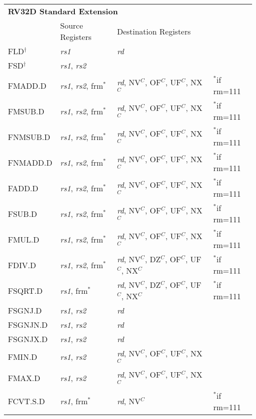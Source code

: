\begin{tabular}{p{25mm}|p{3cm}|p{6cm}|p{10cm}}
  \multicolumn{4}{l}{\bf RV32D Standard Extension} \\
  \cline{2-3}
   & Source Registers & Destination Registers \\
  \cline{2-3}
   FLD$^\dagger$ & {\em rs1} & {\em rd} &  \\
   \cline{2-3}
   FSD$^\dagger$ & {\em rs1}, {\em rs2} &  &  \\
   \cline{2-3}
   FMADD.D & {\em rs1}, {\em rs2}, frm$^*$ & {\em rd}, NV$^C$, OF$^C$, UF$^C$, NX$^C$ & $^*$if rm=111 \\
   \cline{2-3}
   FMSUB.D & {\em rs1}, {\em rs2}, frm$^*$ & {\em rd}, NV$^C$, OF$^C$, UF$^C$, NX$^C$ & $^*$if rm=111 \\
   \cline{2-3}
   FNMSUB.D & {\em rs1}, {\em rs2}, frm$^*$ & {\em rd}, NV$^C$, OF$^C$, UF$^C$, NX$^C$ & $^*$if rm=111 \\
   \cline{2-3}
   FNMADD.D & {\em rs1}, {\em rs2}, frm$^*$ & {\em rd}, NV$^C$, OF$^C$, UF$^C$, NX$^C$ & $^*$if rm=111 \\
   \cline{2-3}
   FADD.D & {\em rs1}, {\em rs2}, frm$^*$ & {\em rd}, NV$^C$, OF$^C$, UF$^C$, NX$^C$ & $^*$if rm=111 \\
   \cline{2-3}
   FSUB.D & {\em rs1}, {\em rs2}, frm$^*$ & {\em rd}, NV$^C$, OF$^C$, UF$^C$, NX$^C$ & $^*$if rm=111 \\
   \cline{2-3}
   FMUL.D & {\em rs1}, {\em rs2}, frm$^*$ & {\em rd}, NV$^C$, OF$^C$, UF$^C$, NX$^C$ & $^*$if rm=111 \\
   \cline{2-3}
   FDIV.D & {\em rs1}, {\em rs2}, frm$^*$ & {\em rd}, NV$^C$, DZ$^C$, OF$^C$, UF$^C$, NX$^C$ & $^*$if rm=111 \\
   \cline{2-3}
   FSQRT.D & {\em rs1}, frm$^*$ & {\em rd}, NV$^C$, DZ$^C$, OF$^C$, UF$^C$, NX$^C$ & $^*$if rm=111 \\
   \cline{2-3}
   FSGNJ.D & {\em rs1}, {\em rs2} & {\em rd} &  \\
   \cline{2-3}
   FSGNJN.D & {\em rs1}, {\em rs2} & {\em rd} &  \\
   \cline{2-3}
   FSGNJX.D & {\em rs1}, {\em rs2} & {\em rd} &  \\
   \cline{2-3}
   FMIN.D & {\em rs1}, {\em rs2} & {\em rd}, NV$^C$, OF$^C$, UF$^C$, NX$^C$ &  \\
   \cline{2-3}
   FMAX.D & {\em rs1}, {\em rs2} & {\em rd}, NV$^C$, OF$^C$, UF$^C$, NX$^C$ &  \\
   \cline{2-3}
   FCVT.S.D & {\em rs1}, frm$^*$ & {\em rd}, NV$^C$ & $^*$if rm=111 \\

\end{tabular}
